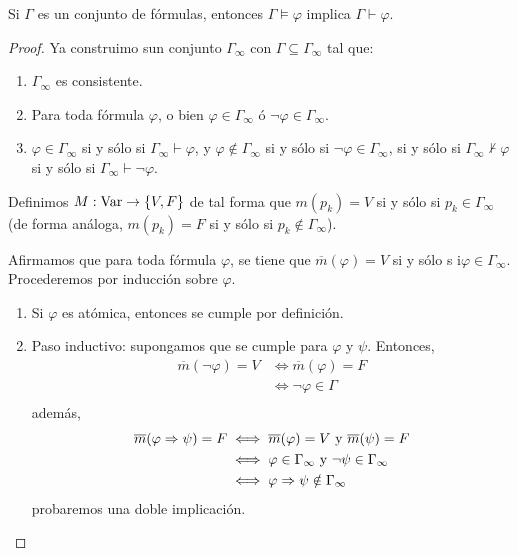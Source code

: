 \documentclass[12pt]{report}
\newcounter{it}
\theoremstyle{largebreak}
\newcommand\cf[3]{\ensuremath{#1:#2\rightarrow#3}}
\begin{document}
    \begin{cor}
        Si $\Gamma$ es un conjunto de fórmulas, entonces $\Gamma\vDash\varphi$ implica $\Gamma\vdash\varphi$. 
    \end{cor}

    \begin{proof}
        
        Ya construimo sun conjunto $\Gamma_\infty$ con $\Gamma\subseteq\Gamma_\infty$ tal que:
        \begin{enumerate}
            \item $\Gamma_\infty$ es consistente.
            \item Para toda fórmula $\varphi$, o bien $\varphi\in\Gamma_\infty$ ó $\neg\varphi\in\Gamma_\infty$.
            \item $\varphi\in\Gamma_\infty$ si y sólo si $\Gamma_\infty\vdash\varphi$, y $\varphi\notin\Gamma_\infty$ si y sólo si $\neg\varphi\in\Gamma_\infty$, si y sólo si $\Gamma_\infty\nvdash\varphi$ si y sólo si $\Gamma_\infty\vdash\neg\varphi$.
        \end{enumerate}

        Definimos $\cf{M}{\textup{Var}}{\left\{V,F\right\}}$ de tal forma que $m(p_k)=V$ si y sólo si $p_k\in\Gamma_\infty$ (de forma análoga, $m(p_k)=F$ si y sólo si $p_k\notin\Gamma_\infty$).

        Afirmamos que para toda fórmula $\varphi$, se tiene que $\overline{m}(\varphi)=V$ si y sólo s i$\varphi\in\Gamma_\infty$. Procederemos por inducción sobre $\varphi$.
        \begin{enumerate}
            \item Si $\varphi$ es atómica, entonces se cumple por definición.
            \item Paso inductivo: supongamos que se cumple para $\varphi$ y $\psi$. Entonces,
            \begin{equation*}
                \begin{split}
                    \overline{m}(\neg\varphi)=V&\iff \overline{m}(\varphi)=F\\
                    &\iff \neg\varphi\in\Gamma\\
                \end{split}
            \end{equation*}
            además,
            \begin{equation*}
                \begin{split}
                    \overline{m}(\varphi\Rightarrow\psi)=F&\iff\overline{m}(\varphi)=V\textup{ y } \overline{m}(\psi)=F\\
                    &\iff \varphi\in\Gamma_\infty\textup{ y } \neg\psi\in\Gamma_\infty\\
                    &\iff \varphi\Rightarrow\psi\notin \Gamma_\infty\\
                \end{split}
            \end{equation*}
            probaremos una doble implicación.
            

\end{enumerate}
\end{proof}
\end{document}
